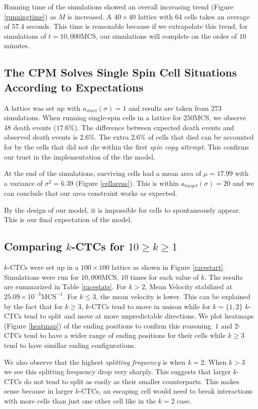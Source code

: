 \documentclass[12pt]{article}
\begin{document}
Running time of the simulations showed an overall increasing trend (Figure \ref{runningtime}) as $M$ is increased. A $40\times40$ lattice with $64$ cells takes an average of $57.4$ seconds. This time is reasonable because if we extrapolate this trend, for simulations of $t=10,000$MCS, our simulations will complete on the order of $10$ minutes.

\subsection{The CPM Solves Single Spin Cell Situations According to Expectations}
A lattice was set up with $a_{start}(\sigma)=1$ and results are taken from $273$ simulations. When running single-spin cells in a lattice for $250$MCS, we observe 48 death events ($17.6\%$). The difference between expected death events and observed death events is $2.6\%$. The extra $2.6\%$ of cells that died can be accounted for by the cells that did not die within the first \emph{spin copy attempt}. This confirms our trust in the implementation of the the model.

At the end of the simulations, surviving cells had a mean area of $\mu = 17.99$ with a variance of $\sigma^2 = 6.39$ (Figure \ref{cellareas}). This is within $a_{target}(\sigma)=20$ and we can conclude that our area constraint works as expected. 

By the design of our model, it is impossible for cells to spontaneously appear. This is our final expectation of the model.

\subsection{Comparing $k$-CTCs for $10 \geq k\geq1$} %
$k$-CTCs were set up in a $100\times100$ lattice as shown in Figure \ref{racestart}. Simulations were run for $10,000$MCS, $10$ times for each value of $k$. The results are summarized in Table \ref{racestats}. For $k>2$, Mean Velocity stabilized at $25.09\times10^{-3}\text{MCS}^{-1}$. For $k\leq3$, the mean velocity is lower. This can be explained by the fact that for $k\geq3$, $k$-CTCs tend to move in unison while for $k=\{1,2\}$ $k$-CTCs tend to split and move at more unpredictable directions. We plot heatmaps (Figure \ref{heatmap}) of the ending positions to confirm this reasoning. $1$ and $2$-CTCs tend to have a wider range of ending positions for their cells while $k\geq3$ tend to have simillar ending configurations.

We also observe that the highest \emph{splitting frequency} is when $k=2$. When $k>3$ we see this splitting frequency drop very sharply. This suggests that larger $k$-CTCs do not tend to split as easily as their smaller counterparts. This makes sense because in larger $k$-CTCs, an escaping cell would need to break interactions with more cells than just one other cell like in the $k=2$ case.
\end{document}
